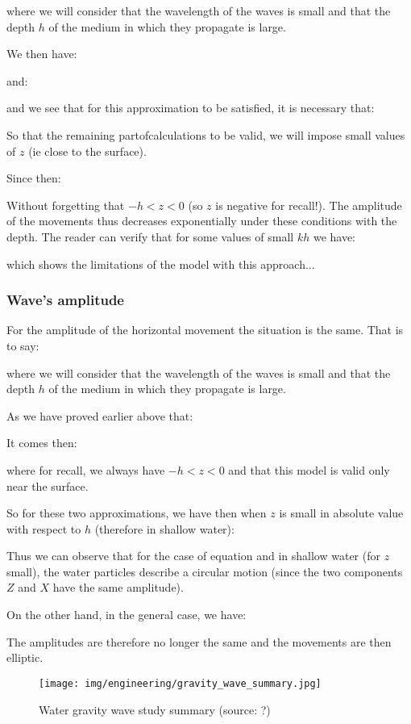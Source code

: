 	where we will consider that the wavelength of the waves is small and that the depth $h$ of the medium in which they propagate is large.

	We then have:
	
	and:
	
	and we see that for this approximation to be satisfied, it is necessary that:
	
	So that the remaining partofcalculations to be valid, we will impose small values of $z$ (ie close to the surface).

	Since then:
	
	Without forgetting that $-h<z<0$ (so $z$ is negative for recall!). The amplitude of the movements thus decreases exponentially under these conditions with the depth. The reader can verify that for some values of small $kh$ we have:
	
	which shows the limitations of the model with this approach...
	
	\subsubsection{Wave's amplitude}
	For the amplitude of the horizontal movement the situation is the same. That is to say:
	
	where we will consider that the wavelength of the waves is small and that the depth $h$ of the medium in which they propagate is large.

	As we have proved earlier above that:
	
	It comes then:
	
	where for recall, we always have $-h<z<0$ and that this model is valid only near the surface.

	So for these two approximations, we have then when $z$ is small in absolute value with respect to $h$ (therefore in shallow water):
	
	Thus we can observe that for the case of equation and in shallow water (for $z$ small), the water particles describe a circular motion (since the two components $Z$ and $X$ have the same amplitude).

	On the other hand, in the general case, we have:
	
	The amplitudes are therefore no longer the same and the movements are then elliptic.
	\begin{figure}[H]
		\centering
		\texttt{[image: img/engineering/gravity\_wave\_summary.jpg]}	
		\caption[Water gravity wave study summary]{Water gravity wave study summary (source: ?)}
	\end{figure}

